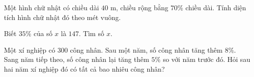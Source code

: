 \begin{ex} %
Một hình chữ nhật có chiều dài $40\text{ m}$, chiều rộng bằng $70\%$ chiều dài. Tính diện tích hình chữ nhật đó theo mét vuông.
\end{ex}

\begin{ex} %
Biết $35\%$ của số $x$ là $147$. Tìm số $x$.
\end{ex}

\begin{ex} %
Một xí nghiệp có $300$ công nhân. Sau một năm, số công nhân tăng thêm $8\%$. Sang năm tiếp theo, số công nhân lại tăng thêm $5\%$ so với năm trước đó. Hỏi sau hai năm xí nghiệp đó có tất cả bao nhiêu công nhân?
\end{ex}
